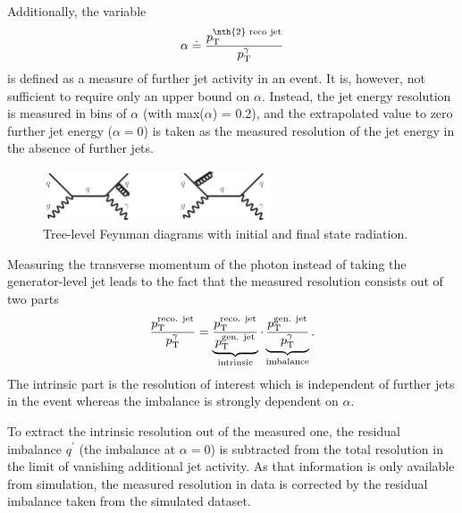 Additionally, the variable 
\begin{equation*}\label{res:eq:alphaDef}
\alpha \doteq \frac{\pt^{\text{\nth{2} reco jet}}}{\pt^{\gamma}}
\end{equation*} 
is defined as a measure of further jet activity in an event. 
It is, however, not sufficient to require only an upper bound on $\alpha$. 
Instead, the jet energy resolution is measured in bins of $\alpha$ (with max($\alpha$) = 0.2), 
and the extrapolated value to zero further jet energy ($\alpha=0$) is taken as the measured resolution of the jet energy in the absence of further jets.
\begin{figure}[t]
  \centering
      \includegraphics[width=0.60\textwidth]{figures/resolution/generalApproach/FeynmanDiagramsWithRadiation.pdf}
  \caption{Tree-level Feynman diagrams with initial and final state radiation.}  
  \label{res:fig:FeynmanDiagramsWithRadiation}
\end{figure}

Measuring the transverse momentum of the photon instead of taking the generator-level jet \pt leads to the fact that the measured resolution consists out of two parts
\begin{equation*}\label{res:eq:splitting}
\frac{p_{\text{T}}^{\text{reco. jet}}}{p_{\text{T}}^{\gamma}} = \underbrace{\frac{p_{\text{T}}^{\text{reco. jet}}}{p_{\text{T}}^{\text{gen. jet}}}}_{\text{intrinsic}} \cdot \underbrace{\frac{p_{\text{T}}^{\text{gen. jet}}}{p_{\text{T}}^{\gamma}}}_{\text{imbalance}}.
\end{equation*}
The intrinsic part is the resolution of interest which is independent of further jets in the event whereas the imbalance is strongly dependent on $\alpha$.

To extract the intrinsic resolution out of the measured one, the residual imbalance $q^{\prime}$ (the imbalance at $\alpha = 0$) is subtracted from the total resolution in the 
limit of vanishing additional jet activity. 
As that information is only available from simulation, the measured resolution in data is corrected by the residual imbalance taken from the simulated dataset.

